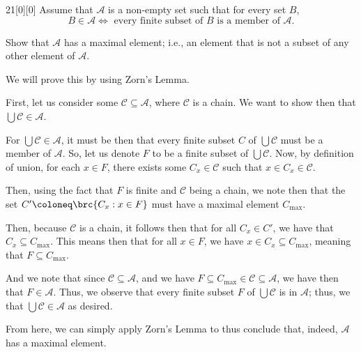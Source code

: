 \documentclass{article}
\begin{document}
\begin{hw}{21}[0][0]
	Assume that $\mathscr A$ is a non-empty set such that for every set $B$,
	\begin{equation*}
		B \in \mathscr A \iff \text{ every finite subset of $B$ is a member of $\mathscr A$}.
	\end{equation*}

	Show that $\mathscr A$ has a maximal element; i.e., an element that is not a subset of any other element of $\mathscr A$.
\end{hw}
\begin{solution}
	We will prove this by using Zorn's Lemma.
	
	First, let us consider some $\mathscr C \subseteq \mathscr A$, where $\mathscr C$ is a chain. We want to show then that $\bigcup \mathscr C \in \mathscr A$.
	
	For $\bigcup\mathscr C \in \mathscr A$, it must be then that every finite subset $C$ of $\bigcup\mathscr C$ must be a member of $\mathscr A$. So, let us denote $F$ to be a finite subset of $\bigcup \mathscr C$. Now, by definition of union, for each $x \in F$, there exists some $C_x \in \mathscr C$ such that $x \in C_x \in \mathscr C$.
	
	Then, using the fact that $F$ is finite and $\mathscr C$ being a chain, we note then that the set $C' \coloneq \brc{C_x : x \in F}$ must have a maximal element $C_{\mathrm{max}}$.
	
	Then, because $\mathscr C$ is a chain, it follows then that for all $C_x \in C'$, we have that $C_x \subseteq C_\mathrm{max}$. This means then that for all $x \in F$, we have $x \in C_x \subseteq C_\mathrm{max}$, meaning that $F \subseteq C_\mathrm{max}$.
	
	And we note that since $\mathscr C \subseteq \mathscr A$, and we have $F \subseteq C_\mathrm{max} \in \mathscr C \subseteq \mathscr A$, we have then that $F \in \mathscr A$. Thus, we observe that every finite subset $F$ of $\bigcup \mathscr C$ is in $\mathscr A$; thus, we that $\bigcup \mathscr C \in \mathscr A$ as desired.
	
	From here, we can simply apply Zorn's Lemma to thus conclude that, indeed, $\mathscr A$ has a maximal element.
\end{solution}
\end{document}
